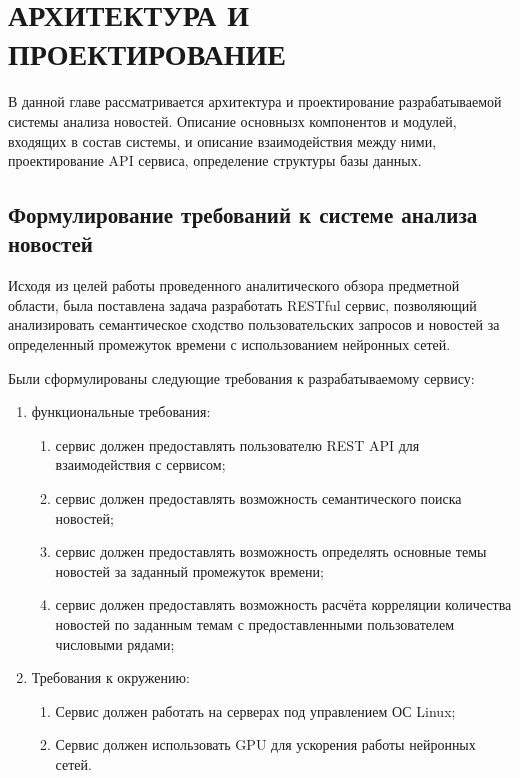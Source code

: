 \chapter{АРХИТЕКТУРА И ПРОЕКТИРОВАНИЕ}
\label{chap:arch_design}
\aftertitle

В данной главе рассматривается архитектура и проектирование разрабатываемой системы анализа новостей. Описание основнызх компонентов и модулей, входящих в состав системы, и описание взаимодействия между ними, проектирование API сервиса, определение структуры базы данных.

\section{Формулирование требований к системе анализа новостей}
Исходя из целей работы проведенного аналитического обзора предметной области, была поставлена задача разработать RESTful сервис, позволяющий анализировать семантическое сходство пользовательских запросов и новостей за определенный промежуток времени с использованием нейронных сетей.

Были сформулированы следующие требования к разрабатываемому сервису:

\begin{enumerate}
    \item функциональные требования:
    \begin{enumerate}
        \item сервис должен предоставлять пользователю REST API для взаимодействия с сервисом;
        \item сервис должен предоставлять возможность семантического поиска новостей;
        \item сервис должен предоставлять возможность определять основные темы новостей за заданный промежуток времени;
        \item сервис должен предоставлять возможность расчёта корреляции количества новостей по заданным темам с предоставленными пользователем числовыми рядами;
    \end{enumerate}
    \item Требования к окружению:
    \begin{enumerate}
        \item Сервис должен работать на серверах под управлением ОС Linux;
        \item Сервис должен использовать GPU для ускорения работы нейронных сетей.
    \end{enumerate}
\end{enumerate}

